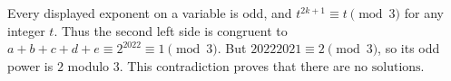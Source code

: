Every displayed exponent on a variable is odd, and $t^{2k+1}\equiv t\pmod3$ for any integer $t$. Thus the second left side is congruent to $a+b+c+d+e\equiv2^{2022}\equiv1\pmod3$. But $20222021\equiv2\pmod3$, so its odd power is $2$ modulo $3$. This contradiction proves that there are $\boxed{\text{no solutions}}$.
